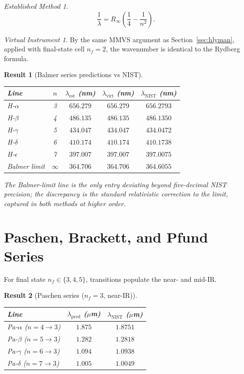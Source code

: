 \documentclass[twocolumn,11pt,a4paper]{article}
\theoremstyle{stmtstyle}
\newtheorem{result}{Result}
\theoremstyle{definition}
\theoremstyle{remark}
\newtheorem*{instrument}{Virtual Instrument}
\newtheorem*{established}{Established Method}
\begin{document}
\begin{established}
\begin{equation}
\frac{1}{\lambda}=R_{\infty}\left(\frac{1}{4}-\frac{1}{n^{2}}\right).
\label{eq:balmerrydberg}
\end{equation}
\end{established}

\begin{instrument}
By the same MMVS argument as Section~\ref{sec:hlyman}, applied with final-state cell $n_{f}=2$, the wavenumber is identical to the Rydberg formula.
\end{instrument}

\begin{result}[Balmer series predictions vs NIST]\label{res:balmer}
\begin{center}\small
\begin{tabular}{lcccc}
\toprule
Line & $n$ & $\lambda_{\mathrm{est}}$ (nm) & $\lambda_{\mathrm{virt}}$ (nm) & $\lambda_{\mathrm{NIST}}$ (nm)\\
\midrule
H-$\alpha$ & 3 & $656.279$ & $656.279$ & $656.2793$\\
H-$\beta$  & 4 & $486.135$ & $486.135$ & $486.1350$\\
H-$\gamma$ & 5 & $434.047$ & $434.047$ & $434.0472$\\
H-$\delta$ & 6 & $410.174$ & $410.174$ & $410.1738$\\
H-$\epsilon$ & 7 & $397.007$ & $397.007$ & $397.0075$\\
Balmer limit & $\infty$ & $364.706$ & $364.706$ & $364.6055$\\
\bottomrule
\end{tabular}
\end{center}
The Balmer-limit line is the only entry deviating beyond five-decimal NIST precision; the discrepancy is the standard relativistic correction to the limit, captured in both methods at higher order.
\end{result}

\section{Paschen, Brackett, and Pfund Series}
\label{sec:hpaschen}

For final state $n_{f}\in\{3,4,5\}$, transitions populate the near- and mid-IR.

\begin{result}[Paschen series ($n_{f}=3$, near-IR)]\label{res:paschen}
\begin{center}\small
\begin{tabular}{lcc}
\toprule
Line & $\lambda_{\mathrm{pred}}$ ($\mu$m) & $\lambda_{\mathrm{NIST}}$ ($\mu$m)\\
\midrule
Pa-$\alpha$ ($n=4\to 3$) & $1.875$ & $1.8751$\\
Pa-$\beta$ ($n=5\to 3$)  & $1.282$ & $1.2818$\\
Pa-$\gamma$ ($n=6\to 3$) & $1.094$ & $1.0938$\\
Pa-$\delta$ ($n=7\to 3$) & $1.005$ & $1.0049$\\
\bottomrule
\end{tabular}
\end{center}
\end{result}
\end{document}
